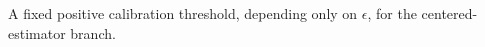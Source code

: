 A fixed positive calibration threshold, depending only on \(\epsilon\), for the centered-estimator branch.
